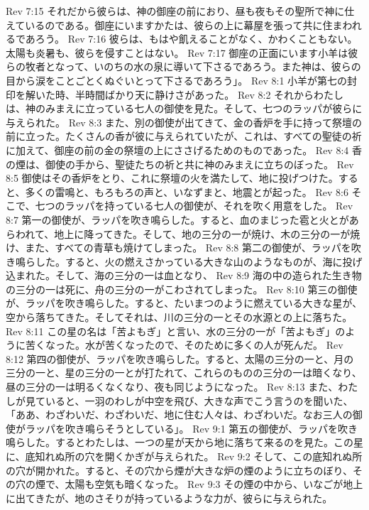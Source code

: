 Rev 7:15  それだから彼らは、神の御座の前におり、昼も夜もその聖所で神に仕えているのである。御座にいますかたは、彼らの上に幕屋を張って共に住まわれるであろう。
Rev 7:16  彼らは、もはや飢えることがなく、かわくこともない。太陽も炎暑も、彼らを侵すことはない。
Rev 7:17  御座の正面にいます小羊は彼らの牧者となって、いのちの水の泉に導いて下さるであろう。また神は、彼らの目から涙をことごとくぬぐいとって下さるであろう」。
Rev 8:1  小羊が第七の封印を解いた時、半時間ばかり天に静けさがあった。
Rev 8:2  それからわたしは、神のみまえに立っている七人の御使を見た。そして、七つのラッパが彼らに与えられた。
Rev 8:3  また、別の御使が出てきて、金の香炉を手に持って祭壇の前に立った。たくさんの香が彼に与えられていたが、これは、すべての聖徒の祈に加えて、御座の前の金の祭壇の上にささげるためのものであった。
Rev 8:4  香の煙は、御使の手から、聖徒たちの祈と共に神のみまえに立ちのぼった。
Rev 8:5  御使はその香炉をとり、これに祭壇の火を満たして、地に投げつけた。すると、多くの雷鳴と、もろもろの声と、いなずまと、地震とが起った。
Rev 8:6  そこで、七つのラッパを持っている七人の御使が、それを吹く用意をした。
Rev 8:7  第一の御使が、ラッパを吹き鳴らした。すると、血のまじった雹と火とがあらわれて、地上に降ってきた。そして、地の三分の一が焼け、木の三分の一が焼け、また、すべての青草も焼けてしまった。
Rev 8:8  第二の御使が、ラッパを吹き鳴らした。すると、火の燃えさかっている大きな山のようなものが、海に投げ込まれた。そして、海の三分の一は血となり、
Rev 8:9  海の中の造られた生き物の三分の一は死に、舟の三分の一がこわされてしまった。
Rev 8:10  第三の御使が、ラッパを吹き鳴らした。すると、たいまつのように燃えている大きな星が、空から落ちてきた。そしてそれは、川の三分の一とその水源との上に落ちた。
Rev 8:11  この星の名は「苦よもぎ」と言い、水の三分の一が「苦よもぎ」のように苦くなった。水が苦くなったので、そのために多くの人が死んだ。
Rev 8:12  第四の御使が、ラッパを吹き鳴らした。すると、太陽の三分の一と、月の三分の一と、星の三分の一とが打たれて、これらのものの三分の一は暗くなり、昼の三分の一は明るくなくなり、夜も同じようになった。
Rev 8:13  また、わたしが見ていると、一羽のわしが中空を飛び、大きな声でこう言うのを聞いた、「ああ、わざわいだ、わざわいだ、地に住む人々は、わざわいだ。なお三人の御使がラッパを吹き鳴らそうとしている」。
Rev 9:1  第五の御使が、ラッパを吹き鳴らした。するとわたしは、一つの星が天から地に落ちて来るのを見た。この星に、底知れぬ所の穴を開くかぎが与えられた。
Rev 9:2  そして、この底知れぬ所の穴が開かれた。すると、その穴から煙が大きな炉の煙のように立ちのぼり、その穴の煙で、太陽も空気も暗くなった。
Rev 9:3  その煙の中から、いなごが地上に出てきたが、地のさそりが持っているような力が、彼らに与えられた。

